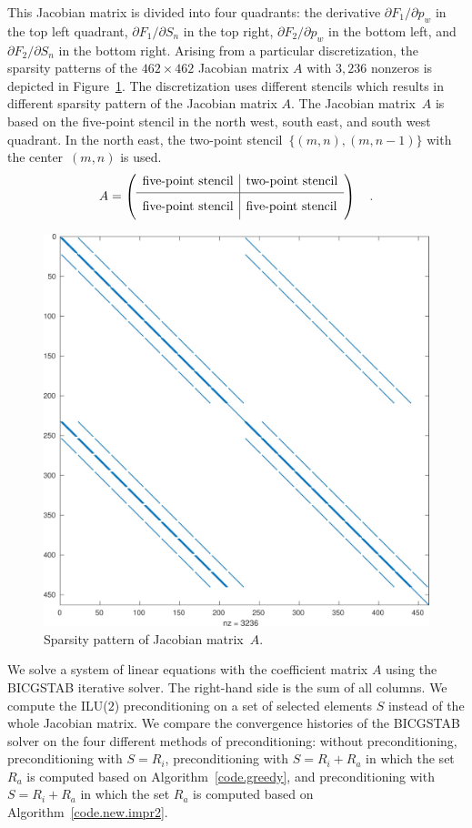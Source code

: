\documentclass[12pt, twoside,a4paper,toc=bibliography]{scrbook}
\newcommand{\figref}[1]{Figure~\protect\ref{#1}}
\newcommand{\coderef}[1]{Algorithm~\protect\ref{#1}}
\begin{document}
This Jacobian matrix is divided into four quadrants: the derivative $\partial F_1 / \partial p_w$ in the top left quadrant, $\partial F_1 / \partial S_n$ in the top right, $\partial F_2 / \partial p_w$ in the bottom left, and $\partial F_2 / \partial S_n$ in the bottom right. Arising from a particular discretization,
the sparsity patterns of the $462 \times 462$ Jacobian matrix $A$
with $3,236$ nonzeros is depicted in \figref{f:geophysik_J_matrices}.
The discretization uses different stencils which results in different
sparsity pattern of the Jacobian matrix $A$.
The Jacobian matrix~$A$ is based on the five-point stencil
in the north west, south east, and south west quadrant.
In the north east, the two-point stencil~$\{(m,n), (m,n-1)\}$ with the center~$(m,n)$ is used.
$$
A =
\left({\begin{array}{l|l}
	\text{five-point stencil} & \text{two-point stencil} \\[0.25em]
	\hline
	\text{five-point stencil} \rule[-7.5pt]{0pt}{21pt} & \text{five-point stencil} \\
 \end{array}} \right)
\quad.
$$

\begin{figure}%
	\footnotesize
	\centering
         \includegraphics[width=0.6\linewidth]{co2_jac}
\caption{Sparsity pattern of Jacobian matrix~$A$.}%
\label{f:geophysik_J_matrices}
\end{figure}

We solve a system of linear equations with the
coefficient matrix $A$ using the BICGSTAB iterative solver.
The right-hand side is the sum of all columns.
We compute the ILU($2$) preconditioning on a set of selected elements $S$
instead of the whole Jacobian matrix. 
We compare the convergence histories of the BICGSTAB solver 
on the four different methods of preconditioning:
without preconditioning,
preconditioning with $S=R_i$,
preconditioning with $S=R_i + R_a$ in which 
the set $R_a$ is computed based on \coderef{code.greedy},
and preconditioning with $S=R_i + R_a$ in which 
the set $R_a$ is computed based on \coderef{code.new.impr2}.
\end{document}

